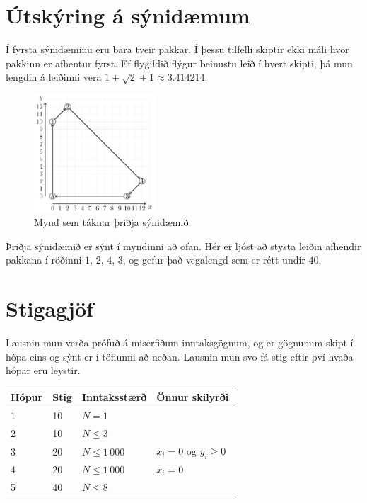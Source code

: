 \section*{Útskýring á sýnidæmum}
Í fyrsta sýnidæminu eru bara tveir pakkar. Í þessu tilfelli skiptir ekki máli
hvor pakkinn er afhentur fyrst. Ef flygildið flýgur beinustu leið í hvert
skipti, þá mun lengdin á leiðinni vera $1 + \sqrt{2} + 1 \approx 3.414214$.

\begin{figure}[ht!]
\centering
\includegraphics[width=0.4\textwidth]{sample3.png}
\caption{Mynd sem táknar þriðja sýnidæmið.}
\end{figure}

Þriðja sýnidæmið er sýnt í myndinni að ofan. Hér er ljóst að stysta leiðin
afhendir pakkana í röðinni $1$, $2$, $4$, $3$, og gefur það vegalengd sem er
rétt undir $40$.

\section*{Stigagjöf}
Lausnin mun verða prófuð á miserfiðum inntaksgögnum, og er gögnunum skipt í
hópa eins og sýnt er í töflunni að neðan. Lausnin mun svo fá stig eftir því
hvaða hópar eru leystir.

\begin{tabular}{| l | l | l | l |}
\hline
Hópur & Stig & Inntaksstærð & Önnur skilyrði\\ \hline
1 & 10  & $N=1$ & \\ \hline
2 & 10  & $N\leq 3$ & \\ \hline
3 & 20  & $N\leq 1\,000$ & $x_i = 0$ og $y_i \geq 0$ \\ \hline
4 & 20  & $N\leq 1\,000$ & $x_i = 0$ \\ \hline
5 & 40  & $N\leq 8$ & \\ \hline
\end{tabular}
